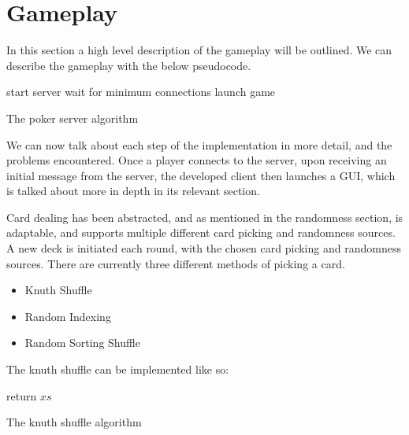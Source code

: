 \section{Gameplay}
In this section a high level description of the gameplay will be outlined.
We can describe the gameplay with the below pseudocode.

\vspace{0.3cm}

\begin{algorithm}[H]
    start server\;
    wait for minimum connections\;
    launch game\;
\caption{The poker server algorithm}%
\label{code:pokerServer}
\end{algorithm}

\vspace{0.3cm}

We can now talk about each step of the implementation in more detail, and the
problems encountered. Once a player connects to the server, upon receiving
an initial message from the server, the developed client then launches
a GUI, which is talked about more in depth in its relevant section.

Card dealing has been abstracted, and as mentioned in the randomness section,
is adaptable, and supports multiple different card picking and randomness
sources. A new deck is initiated each round, with the chosen card picking
and randomness sources. There are currently three different methods of
picking a card.

\begin{itemize}
    \item Knuth Shuffle
    \item Random Indexing
    \item Random Sorting Shuffle
\end{itemize}

The knuth shuffle \parencite{knuth1997} can be implemented like so:

\vspace{0.3cm}

\begin{algorithm}[H]
    \BlankLine{}
    return $xs$\;
\caption{The knuth shuffle algorithm}
\end{algorithm}

